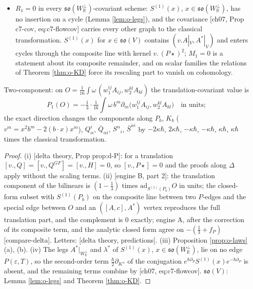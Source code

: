 \begin{proposition}[The translation component and the condition $P_1=0$]
\begin{itemize}
\item[(iv)] $R_1=0$ in every $\mathfrak{so}(W_{\mathbb R}^\perp)$-covariant scheme: $S^{(1)}(x)$, $x\in\mathfrak{so}(W_{\mathbb R}^\perp)$, has no insertion on a cycle (Lemma \ref{lem:o-legs}), and the covariance [ch07, Prop c7-cov, eq:c7-flowcov] carries every other graph to the classical transformation. $S^{(1)}(x)$ for $x\in\mathfrak{so}(V)$ contains $(v.A|_V,A^*|_V)$ and enters cycles through the composite line with kernel $v.\,(P\star)^2$; $M_1=0$ is a statement about its composite remainder, and on scalar families the relations of Theorem \ref{thm:o-KD} force its rescaling part to vanish on cohomology.
\end{itemize}
Two-component: on $O=\tfrac1{16}\int\omega\,(w_1^{ij}A_{ij},w_2^{kl}A_{kl})$ the translation-covariant value is
\[
P_1(O)=-\tfrac13\cdot\tfrac1{16}\int\omega\,b^m\partial_m\big(w_1^{ij}A_{ij},w_2^{kl}A_{kl}\big)\quad\text{in units};
\] the exact direction changes the components along $P_b$, $K_b$ ($v^m=x^2b^m-2(b\cdot x)x^m$), $Q^i_\alpha$, $\bar Q_{\dot\alpha i}$, $S^\alpha{}_i$, $\bar S^{\dot\alpha i}$ by $-2\kappa\hbar$, $2\kappa\hbar$, $-\kappa\hbar$, $-\kappa\hbar$, $\kappa\hbar$, $\kappa\hbar$ times the classical transformation.
\end{proposition}

\begin{proof}
(i) [delta theory, Prop prop:d-P]: for a translation $[v.,Q]=[v.,Q^{GF}]=[v.,H]=0$, so $[v.,P\star]=0$ and the proofs along $\Delta$ apply without the scaling terms. (ii) [engine B, part 2]: the translation component of the bilinears is $(1-\tfrac13)$ times $\mathrm{ad}_{S^{(1)}(P_b)}O$ in units; the closed-form subset with $S^{(1)}(P_b)$ on the composite line between two $P$-edges and the special edge between $O$ and an $([A,c],A^*)$ vertex reproduces the full translation part, and the complement is $0$ exactly; engine A, after the correction of its composite term, and the analytic closed form agree on $-(\tfrac13+f_P)$ [compare-delta]. Letters: [delta theory, predictions]. (iii) Proposition \ref{prop:o-laws} (a), (b). (iv) The legs $A^*|_{W_{\mathbb R}^\perp}$ and $\lambda^*$ of $S^{(1)}(x)$, $x\in\mathfrak{so}(W_{\mathbb R}^\perp)$, lie on no edge $P(\varepsilon,T)$, so the second-order term $\tfrac\hbar2\partial_{K''}$ of the conjugation $e^{\hbar\partial_P}S^{(1)}(x)e^{-\hbar\partial_P}$ is absent, and the remaining terms combine by [ch07, eq:c7-flowcov]. $\mathfrak{so}(V)$: Lemma \ref{lem:o-legs} and Theorem \ref{thm:o-KD}.
\end{proof}

